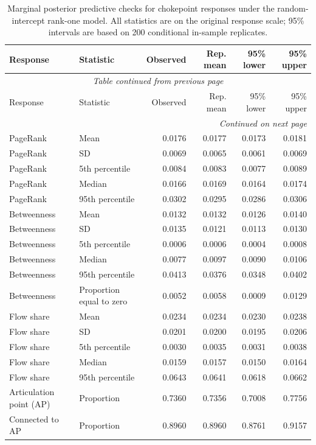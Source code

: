 \documentclass[pdftex,12pt,openright,a4paper,oneside]{book}
\begin{document}
\begingroup
\small
\setlength{\LTleft}{0pt}
\setlength{\LTright}{0pt}
\begin{longtable}{llrrrr}
\caption{Marginal posterior predictive checks for chokepoint responses under the random-intercept rank-one model. 
All statistics are on the original response scale; 95\% intervals are based on 200 conditional in-sample replicates.}
\label{tab:node_chokepoint_marginal_ppc_full}\\
\toprule
Response & Statistic & Observed & Rep. mean & 95\% lower & 95\% upper \\
\midrule
\endfirsthead
\multicolumn{6}{c}{\textit{Table continued from previous page}}\\
\toprule
Response & Statistic & Observed & Rep. mean & 95\% lower & 95\% upper \\
\midrule
\endhead
\midrule
\multicolumn{6}{r}{\textit{Continued on next page}}\\
\endfoot
\bottomrule
\endlastfoot
PageRank & Mean & 0.0176 & 0.0177 & 0.0173 & 0.0181 \\
PageRank & SD & 0.0069 & 0.0065 & 0.0061 & 0.0069 \\
PageRank & 5th percentile & 0.0084 & 0.0083 & 0.0077 & 0.0089 \\
PageRank & Median & 0.0166 & 0.0169 & 0.0164 & 0.0174 \\
PageRank & 95th percentile & 0.0302 & 0.0295 & 0.0286 & 0.0306 \\
\addlinespace[2pt]
Betweenness & Mean & 0.0132 & 0.0132 & 0.0126 & 0.0140 \\
Betweenness & SD & 0.0135 & 0.0121 & 0.0113 & 0.0130 \\
Betweenness & 5th percentile & 0.0006 & 0.0006 & 0.0004 & 0.0008 \\
Betweenness & Median & 0.0077 & 0.0097 & 0.0090 & 0.0106 \\
Betweenness & 95th percentile & 0.0413 & 0.0376 & 0.0348 & 0.0402 \\
Betweenness & Proportion equal to zero & 0.0052 & 0.0058 & 0.0009 & 0.0129 \\
\addlinespace[2pt]
Flow share & Mean & 0.0234 & 0.0234 & 0.0230 & 0.0238 \\
Flow share & SD & 0.0201 & 0.0200 & 0.0195 & 0.0206 \\
Flow share & 5th percentile & 0.0030 & 0.0035 & 0.0031 & 0.0038 \\
Flow share & Median & 0.0159 & 0.0157 & 0.0150 & 0.0164 \\
Flow share & 95th percentile & 0.0643 & 0.0641 & 0.0618 & 0.0662 \\
\addlinespace[2pt]
Articulation point (AP) & Proportion & 0.7360 & 0.7356 & 0.7008 & 0.7756 \\
Connected to AP & Proportion & 0.8960 & 0.8960 & 0.8761 & 0.9157 \\
\end{longtable}
\endgroup
\end{document}
